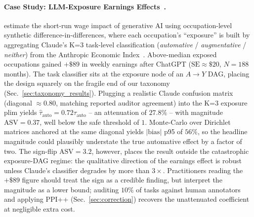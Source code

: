 \paragraph{Case Study: LLM-Exposure Earnings Effects~\cite{sushkov2025llmlabor}.}
\citet{sushkov2025llmlabor} estimate the short-run wage impact of generative
AI using occupation-level synthetic difference-in-differences, where each
occupation's ``exposure'' is built by aggregating Claude's K{=}3 task-level
classification (\emph{automative} / \emph{augmentative} / \emph{neither})
from the Anthropic Economic Index~\cite{handa2025economic}. Above-median
exposed occupations gained $+\$89$ in weekly earnings after ChatGPT
($\text{SE}{\approx}\$20$, $N{=}188$ months). The task classifier sits at
the exposure node of an $A{\to}Y$ DAG, placing the design squarely on the
fragile end of our taxonomy (Sec.~\ref{sec:taxonomy_results}). Plugging a
realistic Claude confusion matrix (diagonal $\approx 0.80$, matching reported
auditor agreement) into the K{=}3 exposure plim yields
$\hat{\tau}_{\text{auto}}{=}0.72\tau_{\text{auto}}$ -- an attenuation of
$27.8\%$ -- with magnitude $\text{ASV}{=}0.37$, well below the safe threshold
of $1$. Monte-Carlo over Dirichlet matrices anchored at the same diagonal
yields $|\text{bias}|$ p95 of $56\%$, so the headline magnitude could
plausibly understate the true automative effect by a factor of two. The
sign-flip $\text{ASV}{=}3.2$, however, places the result outside the
catastrophic exposure-DAG regime: the qualitative direction of the earnings
effect is robust unless Claude's classifier degrades by more than $3{\times}$.
Practitioners reading the $+\$89$ figure should treat the sign as a credible
finding, but interpret the magnitude as a lower bound; auditing $10\%$ of
tasks against human annotators and applying PPI++ (Sec.~\ref{sec:correction})
recovers the unattenuated coefficient at negligible extra cost.
